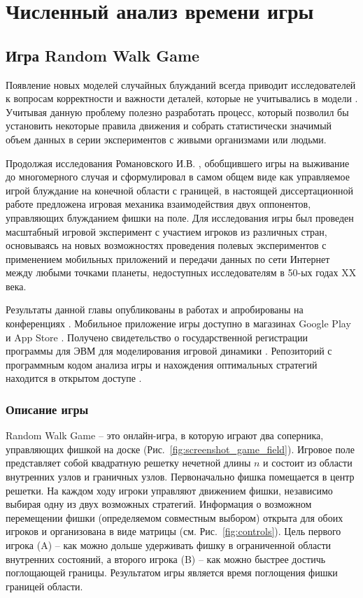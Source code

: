 \chapter{Численный анализ времени игры}\label{ch:ch3}


\section{Игра Random Walk Game}\label{sec:ch3/sec1}

Появление новых моделей случайных блужданий всегда приводит исследователей к вопросам корректности и важности деталей, которые не учитывались в модели \cite{pyke_understanding_2015, lascala-gruenewald_sensory_2019}. Учитывая данную проблему полезно разработать процесс, который позволил бы установить некоторые правила движения и собрать статистически значимый объем данных в серии экспериментов с живыми организмами или людьми. 

Продолжая исследования Романовского И.В. \cite{romanovsky_1961}, обобщившего игры на выживание до многомерного случая и сформулировал в самом общем виде как управляемое игрой блуждание на конечной области с границей, в настоящей диссертационной работе предложена игровая механика взаимодействия двух оппонентов, управляющих блужданием фишки на поле. Для исследования игры был проведен масштабный игровой эксперимент с участием игроков из различных стран, основываясь на новых возможностях проведения полевых экспериментов с применением мобильных приложений и передачи данных по сети Интернет между любыми точками планеты, недоступных исследователям в 50-ых годах XX века. 

Результаты данной главы опубликованы в работах \cite{bib3,bib4} и апробированы на конференциях \cite{confbib1,confbib2,confbib3,confbib4}. Мобильное приложение игры доступно в магазинах Google Play \cite{googleplay} и App Store \cite{applestore}. Получено свидетельство о государственной регистрации программы для ЭВМ для моделирования игровой динамики \cite{progbib1}. Репозиторий с программным кодом анализа игры и нахождения оптимальных стратегий находится в открытом доступе \cite{RWAnalyzer}. 

\subsection{Описание игры}\label{subsec:ch3/sec1/sub1}

Random Walk Game -- это онлайн-игра, в которую играют два соперника, управляющих фишкой на доске (Рис.~\cref{fig:screenshot_game_field}). Игровое поле представляет собой квадратную решетку нечетной длины $n$ и состоит из области внутренних узлов и граничных узлов. Первоначально фишка помещается в центр решетки. На каждом ходу игроки управляют движением фишки, независимо выбирая одну из двух возможных стратегий. Информация о возможном перемещении фишки (определяемом совместным выбором) открыта для обоих игроков и организована в виде матрицы (см. Рис.~\cref{fig:controls}). Цель первого игрока (A) -- как можно дольше удерживать фишку в ограниченной области внутренних состояний, а второго игрока (B) -- как можно быстрее достичь поглощающей границы. Результатом игры является время поглощения фишки границей области.
    
